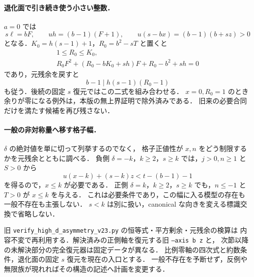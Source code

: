 \paragraph{退化面で引き続き使う小さい整数．}

$a=0$ では
\[
 s\ell=bF,\qquad uh=(b-1)(F+1),\qquad
 u(s-bx)=(b-1)(b+sz)>0
\]
となる．$K_0=h(s-1)+1$，$R_0=b^2-sT$ と置くと
\begin{equation}\label{notes:hd23-degenerate-quadratic}
 \begin{gathered}
 1\le R_0\le K_0,\\
 R_0F^2+(R_0-bK_0+sh)F+R_0-b^2+sh=0
 \end{gathered}
\end{equation}
であり，元残余を戻すと
\begin{equation}\label{notes:hd23-extra-divisibility}
 b-1\mid h(s-1)(R_0-1)
\end{equation}
も従う．後続の固定 $s$ 復元ではこの二式を組み合わせる．
$x=0,R_0=1$ のとき余りが零になる例外は，本版の無上界証明で除外済みである．
旧来の必要合同だけを満たす候補を再び残さない．

\paragraph{一般の非対称量へ移す格子幅．}

$\delta$ の絶対値を単に切って列挙するのでなく，
格子正値性が $x,n$ をどう制限するかを元残余とともに調べる．
負側 $\delta=-k$，$k\ge2$，$s\ge k$ では，$j>0,n\ge1$ と $S>0$ から
\[
 u(x-k)+(s-k)z<t-(b-1)-1
\]
を得るので，$x\le k$ が必要である．
正側 $\delta=k$，$k\ge2$，$s\ge k$ でも，$n\le-1$ と $T>0$ が $x\le k$ を与える．
これは必要条件であり，この幅に入る模型の存在も一般不存在も主張しない．
$s<k$ は別に扱い，canonical な向きを変える標識交換で省略しない．

旧 \nolinkurl{verify_high_d_asymmetry_v23.py} の恒等式・平方剰余・元残余の検算は
内容不変で再利用する．解決済みの正側軸を復元する旧 \texttt{--axis b z} と，
次節以降の未解決部分の完全復元器は固定データが異なる．
比例零軸の四次式と約数条件，退化面の固定 $s$ 復元を現在の入口とする．
一般不存在を予断せず，反例や無限族が現れればその構造の記述へ計画を変更する．

